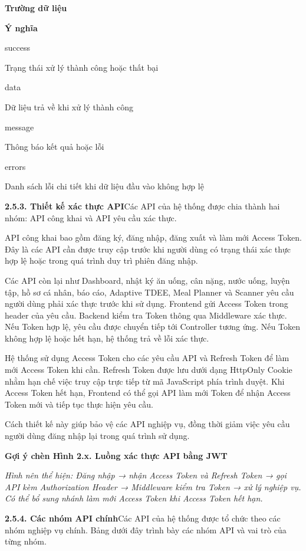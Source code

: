 \textbf{Trường dữ liệu}

\textbf{Ý nghĩa}

success

Trạng thái xử lý thành công hoặc thất bại

data

Dữ liệu trả về khi xử lý thành công

message

Thông báo kết quả hoặc lỗi

errors

Danh sách lỗi chi tiết khi dữ liệu đầu vào không hợp lệ

\textbf{2.5.3. Thiết kế xác thực API}Các API của hệ thống được chia thành hai nhóm: API công khai và API yêu cầu xác thực.

API công khai bao gồm đăng ký, đăng nhập, đăng xuất và làm mới Access Token. Đây là các API cần được truy cập trước khi người dùng có trạng thái xác thực hợp lệ hoặc trong quá trình duy trì phiên đăng nhập.

Các API còn lại như Dashboard, nhật ký ăn uống, cân nặng, nước uống, luyện tập, hồ sơ cá nhân, báo cáo, Adaptive TDEE, Meal Planner và Scanner yêu cầu người dùng phải xác thực trước khi sử dụng. Frontend gửi Access Token trong header của yêu cầu. Backend kiểm tra Token thông qua Middleware xác thực. Nếu Token hợp lệ, yêu cầu được chuyển tiếp tới Controller tương ứng. Nếu Token không hợp lệ hoặc hết hạn, hệ thống trả về lỗi xác thực.

Hệ thống sử dụng Access Token cho các yêu cầu API và Refresh Token để làm mới Access Token khi cần. Refresh Token được lưu dưới dạng HttpOnly Cookie nhằm hạn chế việc truy cập trực tiếp từ mã JavaScript phía trình duyệt. Khi Access Token hết hạn, Frontend có thể gọi API làm mới Token để nhận Access Token mới và tiếp tục thực hiện yêu cầu.

Cách thiết kế này giúp bảo vệ các API nghiệp vụ, đồng thời giảm việc yêu cầu người dùng đăng nhập lại trong quá trình sử dụng.

\textbf{Gợi ý chèn Hình 2.x. Luồng xác thực API bằng JWT}

\textit{Hình nên thể hiện: Đăng nhập → nhận Access Token và Refresh Token → gọi API kèm Authorization Header → Middleware kiểm tra Token → xử lý nghiệp vụ. Có thể bổ sung nhánh làm mới Access Token khi Access Token hết hạn.}

\textbf{2.5.4. Các nhóm API chính}Các API của hệ thống được tổ chức theo các nhóm nghiệp vụ chính. Bảng dưới đây trình bày các nhóm API và vai trò của từng nhóm.

